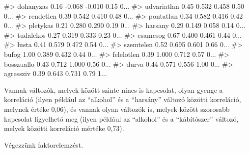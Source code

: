 \documentclass[
  letterpaper,
]{krantz}
\makeatletter
\newenvironment{Shaded}{\begin{snugshade}}{\end{snugshade}}
\newcommand{\CommentTok}[1]{\textcolor[rgb]{0.37,0.37,0.37}{#1}}
\newenvironment{kframe}{%
\medskip{}
\setlength{\fboxsep}{.8em}
 \def\at@end@of@kframe{}%
 \ifinner\ifhmode%
  \def\at@end@of@kframe{\end{minipage}}%
  \begin{minipage}{\columnwidth}%
 \fi\fi%
 \def\FrameCommand##1{\hskip\@totalleftmargin \hskip-\fboxsep
 \colorbox{shadecolor}{##1}\hskip-\fboxsep
     \hskip-\linewidth \hskip-\@totalleftmargin \hskip\columnwidth}%
 \MakeFramed {\advance\hsize-\width
   \@totalleftmargin\z@ \linewidth\hsize
   \@setminipage}}%
 {\par\unskip\endMakeFramed%
 \at@end@of@kframe}
\renewenvironment{Shaded}{\begin{kframe}}{\end{kframe}}
\makeatother
\begin{document}
\begin{Shaded}
\begin{Highlighting}[]
\CommentTok{\#\textgreater{} dohanyzas    0.16     {-}0.068     {-}0.010  0.15     0...}
\CommentTok{\#\textgreater{} udvariatlan  0.45      0.532      0.458  0.50     0...}
\CommentTok{\#\textgreater{} rendetlen    0.39      0.542      0.410  0.48     0...}
\CommentTok{\#\textgreater{} pontatlan    0.34      0.582      0.416  0.42     0...}
\CommentTok{\#\textgreater{} pletykas     0.21      0.280      0.290  0.19     0...}
\CommentTok{\#\textgreater{} harsany      0.29      0.149      0.058  0.14     0...}
\CommentTok{\#\textgreater{} tudalekos    0.27      0.319      0.333  0.23     0...}
\CommentTok{\#\textgreater{} csamcsog     0.67      0.400      0.461  0.44     0...}
\CommentTok{\#\textgreater{} lusta        0.41      0.579      0.472  0.54     0...}
\CommentTok{\#\textgreater{} szemtelen    0.52      0.695      0.601  0.66     0...}
\CommentTok{\#\textgreater{} bufog        1.00      0.389      0.432  0.44     0...}
\CommentTok{\#\textgreater{} felelotlen   0.39      1.000      0.712  0.57     0...}
\CommentTok{\#\textgreater{} bosszuallo   0.43      0.712      1.000  0.56     0...}
\CommentTok{\#\textgreater{} durva        0.44      0.571      0.556  1.00     0...}
\CommentTok{\#\textgreater{} agressziv    0.39      0.643      0.731  0.79     1...}
\end{Highlighting}
\end{Shaded}

Vannak változók, melyek között szinte nincs is kapcsolat, olyan gyenge a
korreláció (ilyen például az ``alkohol'' és a ``harsány'' változó
közötti korreláció, melynek értéke 0,06), és vannak olyan változók is,
melyek között szorosabb kapcsolat figyelhető meg (ilyen például az
``alkohol'' és a ``kábítószer'' változó, melyek közötti korreláció
mértéke 0,73).

Végezzünk faktorelemzést.
\end{document}
